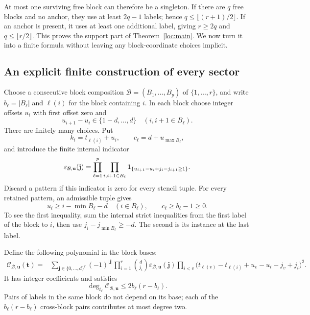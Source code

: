 At most one surviving free block can therefore be a singleton.  If
there are $q$ free blocks and no anchor, they use at least $2q-1$ labels;
hence $q\le\lfloor(r+1)/2\rfloor$.  If an anchor is present, it uses at
least one additional label, giving $r\ge2q$ and
$q\le\lfloor r/2\rfloor$.  This proves the support part of
Theorem~\ref{loc:main}.  We now turn it into a finite formula without
leaving any block-coordinate choices implicit.

\subsection{An explicit finite construction of every sector}

Choose a consecutive block composition
$\mathcal B=(B_1,\ldots,B_p)$ of $\{1,\ldots,r\}$, and write
$b_\ell=|B_\ell|$ and $\ell(i)$ for the block containing $i$.  In each
block choose integer offsets $u_i$ with first offset zero and
\begin{equation}
 u_{i+1}-u_i\in\{1-d,\ldots,d\}
                    \quad(i,i+1\in B_\ell).
 \label{loc:offsets}
\end{equation}
There are finitely many choices.  Put
\[
 k_i=t_{\ell(i)}+u_i,
 \qquad c_\ell=d+u_{\max B_\ell},
\]
and introduce the finite internal indicator
\[
 \varepsilon_{\mathcal B,\mathbf u}(\mathbf j)
 =\prod_{\ell=1}^p\prod_{\substack{i,i+1\in B_\ell}}
       \mathbf 1_{\{u_{i+1}-u_i+j_i-j_{i+1}\ge1\}}.
\]
Discard a pattern if this indicator is zero for every stencil tuple.
For every retained pattern, an admissible tuple gives
\begin{equation}
 u_i\ge i-\min B_\ell-d\quad(i\in B_\ell),
 \qquad c_\ell\ge b_\ell-1\ge0.
 \label{loc:offset-feasibility}
\end{equation}
To see the first inequality, sum the internal strict inequalities from
the first label of the block to $i$, then use $j_i-j_{\min B_\ell}\ge-d$.
The second is its instance at the last label.

Define the following polynomial in the block bases:
\begin{align}
 \mathcal C_{\mathcal B,\mathbf u}(\mathbf t)
 ={}&\sum_{\mathbf j\in\{0,\ldots,d\}^r}
       (-1)^{|\mathbf j|}\prod_{i=1}^r\binom d{j_i}
       \varepsilon_{\mathcal B,\mathbf u}(\mathbf j)
       \prod_{i<v}
       \bigl(t_{\ell(v)}-t_{\ell(i)}+u_v-u_i-j_v+j_i\bigr)^2.
 \label{loc:sector-polynomial}
\end{align}
It has integer coefficients and satisfies
\begin{equation}
 \deg_{t_\ell}\mathcal C_{\mathcal B,\mathbf u}
                         \le 2b_\ell(r-b_\ell).
 \label{loc:sector-degree}
\end{equation}
Pairs of labels in the same block do not depend on its base; each of
the $b_\ell(r-b_\ell)$ cross-block pairs contributes at most degree two.

